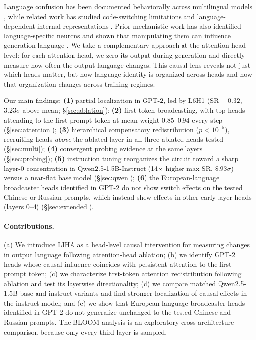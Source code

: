 \documentclass[11pt]{article}
\begin{document}
Language confusion has been documented behaviorally across multilingual
models \citep{marchisio-etal-2024-understanding}, while related work has
studied code-switching limitations and language-dependent internal
representations \citep{wendler-etal-2024-llamas}. Prior mechanistic work has also identified
language-specific neurons and shown that manipulating them can influence
generation language \citep{tang-etal-2024-language}. We take a
complementary approach at the attention-head level: for each attention
head, we zero its output during generation and directly measure how often
the output language changes. This causal lens reveals not just which heads
matter, but how language identity is organized across heads and how that
organization changes across training regimes.

Our main findings: \textbf{(1)} partial localization in GPT-2, led by
L6H1 (SR$=$0.32, 3.23$\sigma$ above mean; \S\ref{sec:ablation});
\textbf{(2)} first-token broadcasting, with top heads attending to the
first prompt token at mean weight 0.85--0.94 every step
(\S\ref{sec:attention}); \textbf{(3)} hierarchical compensatory
redistribution ($p<10^{-5}$), recruiting heads \emph{above} the
ablated layer in all three ablated heads tested (\S\ref{sec:multi}); \textbf{(4)} convergent probing
evidence at the same layers (\S\ref{sec:probing}); \textbf{(5)}
instruction tuning reorganizes the circuit toward a sharp layer-0
concentration in Qwen2.5-1.5B-Instruct (14$\times$ higher max SR,
8.93$\sigma$) versus a near-flat base model (\S\ref{sec:qwen});
\textbf{(6)} the European-language broadcaster heads identified in GPT-2 do not
show switch effects on the tested Chinese or Russian prompts, which instead
show effects in other early-layer heads (layers 0--4)
(\S\ref{sec:extended}).

\paragraph{Contributions.} (a) We introduce LIHA as a head-level causal
intervention for measuring changes in output language following attention-head
ablation; (b) we identify GPT-2 heads whose causal influence coincides with
persistent attention to the first prompt token; (c) we characterize
first-token attention redistribution following ablation and test its layerwise
directionality; (d) we compare matched Qwen2.5-1.5B base and instruct variants
and find stronger localization of causal effects in the instruct model; and
(e) we show that European-language broadcaster heads identified in GPT-2 do
not generalize unchanged to the tested Chinese and Russian prompts. The BLOOM
analysis is an exploratory cross-architecture comparison because only every
third layer is sampled.
\end{document}
